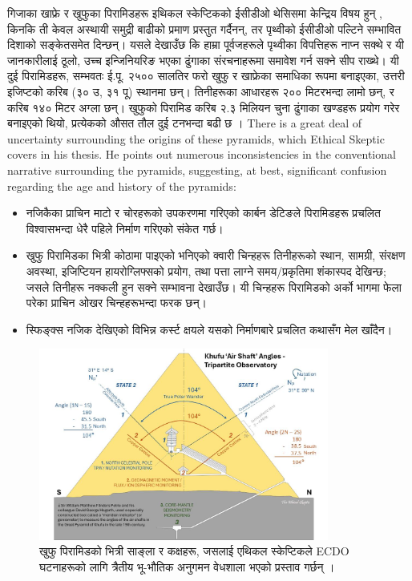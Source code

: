 \documentclass[10pt,twocolumn,letterpaper]{article}
\begin{document}
गिजाका खाफ्रे र खुफुका पिरामिडहरू इथिकल स्केप्टिकको ईसीडीओ थेसिसमा केन्द्रिय विषय हुन् \cite{27}, किनकि ती केवल अस्थायी समुद्री बाढीको प्रमाण प्रस्तुत गर्दैनन्, तर पृथ्वीको ईसीडीओ पल्टिने सम्भावित दिशाको सङ्केतसमेत दिन्छन्। यसले देखाउँछ कि हाम्रा पूर्वजहरूले पृथ्वीका विपत्तिहरू नाप्न सक्थे र यी जानकारीलाई ठूलो, उच्च इन्जिनियरिङ भएका ढुंगाका संरचनाहरूमा समावेश गर्न सक्ने सीप राख्थे। यी दुई पिरामिडहरू, सम्भवतः ई.पू. २५०० सालतिर फरो खुफु र खाफ्रेका समाधिका रूपमा बनाइएका, उत्तरी इजिप्टको करिब (३० उ, ३१ पू) स्थानमा छन्। तिनीहरूका आधारहरू २०० मिटरभन्दा लामो छन्, र करिब १४० मिटर अग्ला छन्। खुफुको पिरामिड करिब २.३ मिलियन चुना ढुंगाका खण्डहरू प्रयोग गरेर बनाइएको थियो, प्रत्येकको औसत तौल दुई टनभन्दा बढी छ \cite{24, 25}।
There is a great deal of uncertainty surrounding the origins of these pyramids, which Ethical Skeptic covers in his thesis. He points out numerous inconsistencies in the conventional narrative surrounding the pyramids, suggesting, at best, significant confusion regarding the age and history of the pyramids:

\begin{flushleft}
\begin{itemize}
    \item नजिकैका प्राचिन माटो र चोरहरूको उपकरणमा गरिएको कार्बन डेटिङले पिरामिडहरू प्रचलित विश्वासभन्दा धेरै पहिले निर्माण गरिएको संकेत गर्छ।
    \item खुफु पिरामिडका भित्री कोठामा पाइएको भनिएको क्वारी चिन्हहरू तिनीहरूको स्थान, सामग्री, संरक्षण अवस्था, इजिप्टियन हायरोग्लिफ्सको प्रयोग, तथा पत्ता लाग्ने समय/प्रकृतिमा शंकास्पद देखिन्छ; जसले तिनीहरू नक्कली हुन सक्ने सम्भावना देखाउँछ। यी चिन्हहरू पिरामिडको अर्को भागमा फेला परेका प्राचिन ओखर चिन्हहरूभन्दा फरक छन्।
    \item स्फिङ्क्स नजिक देखिएको विभिन्न कर्स्ट क्षयले यसको निर्माणबारे प्रचलित कथासँग मेल खाँदैन।
\end{itemize}
\end{flushleft}
\begin{figure}[b]
\begin{center}
\includegraphics[width=0.85\textwidth]{shafts.jpg}
\end{center}
   \caption{खुफु पिरामिडको भित्री साङ्ला र कक्षहरू, जसलाई एथिकल स्केप्टिकले ECDO घटनाहरूको लागि त्रैतीय भू-भौतिक अनुगमन वेधशाला भएको प्रस्ताव गर्छन् \cite{28}।}
\label{fig:5}
\end{figure}
\end{document}
